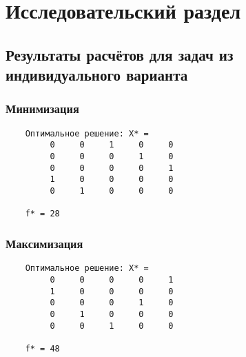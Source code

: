 

\chapter{Исследовательский раздел}

\section{Результаты расчётов для задач из индивидуального варианта}

\subsection{Минимизация}

\begin{verbatim}
	Оптимальное решение: X* =
	     0     0     1     0     0
	     0     0     0     1     0
	     0     0     0     0     1
	     1     0     0     0     0
	     0     1     0     0     0

	f* = 28
\end{verbatim}

\subsection{Максимизация}

\begin{verbatim}
	Оптимальное решение: X* =
	     0     0     0     0     1
	     1     0     0     0     0
	     0     0     0     1     0
	     0     1     0     0     0
	     0     0     1     0     0

	f* = 48
\end{verbatim}
